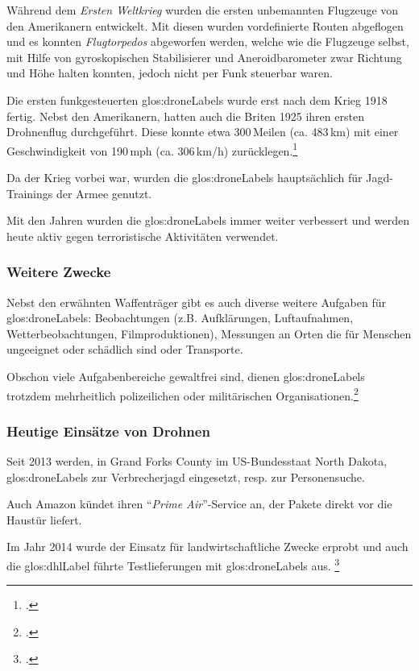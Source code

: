 Während dem \textit{Ersten Weltkrieg} wurden die ersten unbemannten Flugzeuge von den Amerikanern entwickelt.
Mit diesen wurden vordefinierte Routen abgeflogen und es konnten \textit{Flugtorpedos} abgeworfen werden, welche wie die Flugzeuge selbst, mit Hilfe von gyroskopischen Stabilisierer und Aneroidbarometer zwar Richtung und Höhe halten konnten, jedoch nicht per Funk steuerbar waren.

Die ersten funkgesteuerten \glspl{glos:droneLabel} wurde erst nach dem Krieg 1918 fertig.
Nebst den Amerikanern, hatten auch die Briten 1925 ihren ersten Drohnenflug durchgeführt. Diese konnte etwa 300\,Meilen (ca. 483\,km) mit einer Geschwindigkeit von 190\,mph (ca. 306\,km/h) zurücklegen.\footcite{Informatik_und_Gesellschaft_2015-03-21}

Da der Krieg vorbei war, wurden die \glspl{glos:droneLabel} hauptsächlich für Jagd-Trainings der Armee genutzt.

Mit den Jahren wurden die \glspl{glos:droneLabel} immer weiter verbessert und werden heute aktiv gegen terroristische Aktivitäten verwendet.

\subsubsection{Weitere Zwecke}
Nebst den erwähnten Waffenträger gibt es auch diverse weitere Aufgaben für \glspl{glos:droneLabel}: Beobachtungen (z.B. Aufklärungen, Luftaufnahmen, Wetterbeobachtungen, Filmproduktionen), Messungen an Orten die für Menschen ungeeignet oder schädlich sind oder Transporte.

Obschon viele Aufgabenbereiche gewaltfrei sind, dienen \glspl{glos:droneLabel} trotzdem mehrheitlich polizeilichen oder militärischen Organisationen.\footcite{Die_Geschichte_der_Drohnen_DiePresse.com_2015-03-21}

\subsubsection{Heutige Einsätze von Drohnen}
Seit 2013 werden, in Grand Forks County im US-Bundesstaat North Dakota, \glspl{glos:droneLabel} zur Verbrecherjagd eingesetzt, resp. zur Personensuche.

Auch Amazon kündet ihren "`\textit{Prime Air}"'-Service an, der Pakete direkt vor die Haustür liefert.

Im Jahr 2014 wurde der Einsatz für landwirtschaftliche Zwecke erprobt und auch die \gls{glos:dhlLabel} führte Testlieferungen mit \glspl{glos:droneLabel} aus. \footcite{Kleine_Geschichte_der_Drohnen_-_Nachrichten_Print_-_WELT_KOMPAKT_-_Lifestyle_-_DIE_WELT_2015-03-21}


